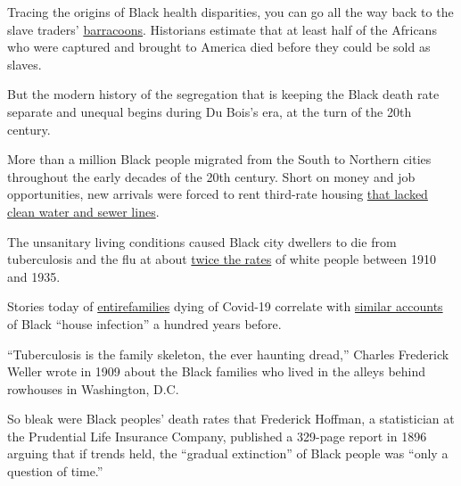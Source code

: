 Tracing the origins of Black health disparities, you can go all the way
back to the slave traders'
\href{http://slaveryimages.org/s/slaveryimages/item/1937}{barracoons}.
Historians estimate that at least half of the Africans who were captured
and brought to America died before they could be sold as slaves.

But the modern history of the segregation that is keeping the Black
death rate separate and unequal begins during Du Bois's era, at the turn
of the 20th century.

More than a million Black people migrated from the South to Northern
cities throughout the early decades of the 20th century. Short on money
and job opportunities, new arrivals were forced to rent third-rate
housing
\href{https://uncpress.org/book/9780807859346/infectious-fear/}{that
lacked clean water and sewer lines}.

The unsanitary living conditions caused Black city dwellers to die from
tuberculosis and the flu at about
\href{https://link.springer.com/article/10.1007/s13524-019-00789-z?shared-article-renderer}{twice
the rates} of white people between 1910 and 1935.

Stories today of
\href{https://www.washingtonpost.com/local/a-woman-her-brother-and-their-mother-all-lost-to-covid-19-the-viruss-devastating-toll-on-one-dc-area-family/2020/05/02/f0c3403a-8bef-11ea-9dfd-990f9dcc71fc_story.html}{entire}\href{https://www.washingtonpost.com/local/a-woman-her-brother-and-their-mother-all-lost-to-covid-19-the-viruss-devastating-toll-on-one-dc-area-family/2020/05/02/f0c3403a-8bef-11ea-9dfd-990f9dcc71fc_story.html}{familie}\href{https://www.washingtonpost.com/local/a-woman-her-brother-and-their-mother-all-lost-to-covid-19-the-viruss-devastating-toll-on-one-dc-area-family/2020/05/02/f0c3403a-8bef-11ea-9dfd-990f9dcc71fc_story.html}{s}
dying of Covid-19 correlate with
\href{https://uncpress.org/book/9780807859346/infectious-fear/}{similar
accounts} of Black ``house infection'' a hundred years before.

``Tuberculosis is the family skeleton, the ever haunting dread,''
Charles Frederick Weller wrote in 1909 about the Black families who
lived in the alleys behind rowhouses in Washington, D.C.

So bleak were Black peoples' death rates that Frederick Hoffman, a
statistician at the Prudential Life Insurance Company, published a
329-page report in 1896 arguing that if trends held, the ``gradual
extinction'' of Black people was ``only a question of time.''

